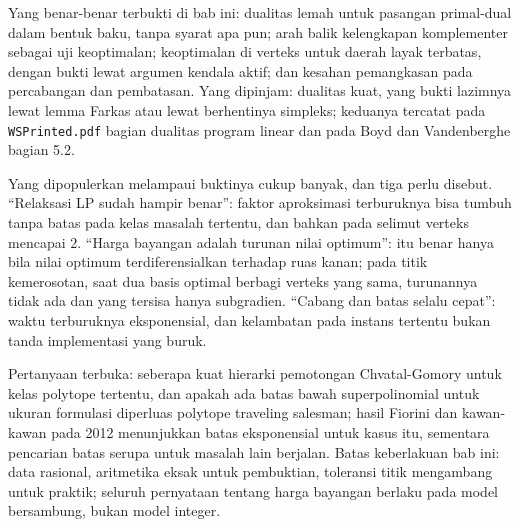 \begin{untukpeneliti}
Yang benar-benar terbukti di bab ini: dualitas lemah untuk pasangan primal-dual dalam bentuk
baku, tanpa syarat apa pun; arah balik kelengkapan komplementer sebagai uji keoptimalan;
keoptimalan di verteks untuk daerah layak terbatas, dengan bukti lewat argumen kendala aktif;
dan kesahan pemangkasan pada percabangan dan pembatasan. Yang dipinjam: dualitas kuat, yang bukti
lazimnya lewat lemma Farkas atau lewat berhentinya simpleks; keduanya tercatat pada
\texttt{WSPrinted.pdf} bagian dualitas program linear dan pada Boyd dan Vandenberghe
bagian 5.2.

Yang dipopulerkan melampaui buktinya cukup banyak, dan tiga perlu disebut.
``Relaksasi LP sudah hampir benar'': faktor aproksimasi terburuknya bisa tumbuh tanpa batas
pada kelas masalah tertentu, dan bahkan pada selimut verteks mencapai $2$. ``Harga bayangan
adalah turunan nilai optimum'': itu benar hanya bila nilai optimum terdiferensialkan terhadap
ruas kanan; pada titik kemerosotan, saat dua basis optimal berbagi verteks yang sama,
turunannya tidak ada dan yang tersisa hanya subgradien. ``Cabang dan batas selalu cepat'':
waktu terburuknya eksponensial, dan kelambatan pada instans tertentu bukan tanda implementasi
yang buruk.

Pertanyaan terbuka: seberapa kuat hierarki pemotongan Chvatal-Gomory untuk kelas polytope
tertentu, dan apakah ada batas bawah superpolinomial untuk ukuran formulasi diperluas
polytope traveling salesman; hasil Fiorini dan kawan-kawan pada 2012 menunjukkan batas
eksponensial untuk kasus itu, sementara pencarian batas serupa untuk masalah lain
berjalan. Batas keberlakuan bab ini: data rasional, aritmetika eksak
untuk pembuktian, toleransi titik mengambang untuk praktik; seluruh pernyataan tentang harga
bayangan berlaku pada model bersambung, bukan model integer.


\end{untukpeneliti}

